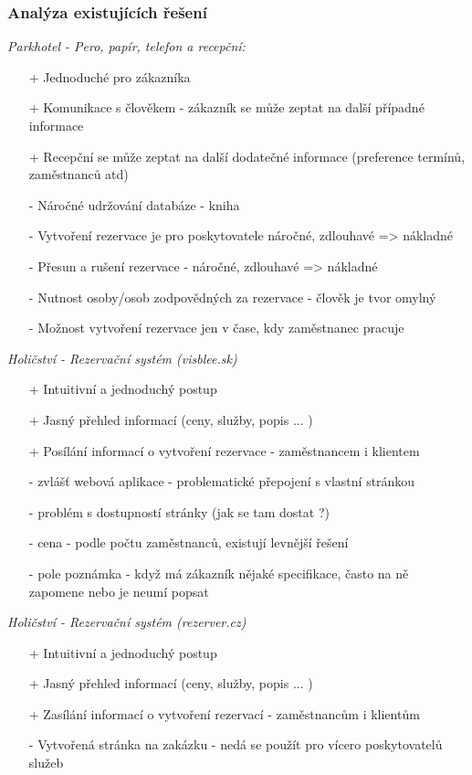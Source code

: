 \subsubsection*{Analýza existujících řešení}
\noindent\emph{Parkhotel - Pero, papír, telefon a recepční:}
\begin{itemize}
    \item[+] Jednoduché pro zákazníka
    \item[+] Komunikace s člověkem - zákazník se může zeptat na další případné informace
    \item[+] Recepční se může zeptat na další dodatečné informace (preference termínů, zaměstnanců atd)
    \item[-] Náročné udržování databáze - kniha
    \item[-] Vytvoření rezervace je pro poskytovatele náročné, zdlouhavé => nákladné
    \item[-] Přesun a rušení rezervace - náročné, zdlouhavé => nákladné
    \item[-] Nutnost osoby/osob zodpovědných za rezervace - člověk je tvor omylný
    \item[-] Možnost vytvoření rezervace jen v čase, kdy zaměstnanec pracuje
\end{itemize}

\noindent\emph{Holičství - Rezervační systém (visblee.sk)}
\begin{itemize}
    \item[+] Intuitivní a jednoduchý postup
    \item[+] Jasný přehled informací (ceny, služby, popis ... )
    \item[+] Posílání informací o vytvoření rezervace  - zaměstnancem i klientem
    \item[-] zvlášť webová aplikace - problematické přepojení s vlastní stránkou
    \item[-] problém s dostupností stránky (jak se tam dostat ?)
    \item[-] cena - podle počtu zaměstnanců, existují levnější řešení
    \item[-] pole poznámka - když má zákazník nějaké specifikace, často na ně zapomene nebo je neumí popsat
\end{itemize}

\noindent\emph{Holičství - Rezervační systém (rezerver.cz)}
\begin{itemize}
    \item[+] Intuitivní a jednoduchý postup
    \item[+] Jasný přehled informací (ceny, služby, popis ... )
    \item[+] Zasílání informací o vytvoření rezervací  - zaměstnancům i klientům
    \item[-] Vytvořená stránka na zakázku - nedá se použít pro vícero poskytovatelů služeb
\end{itemize}

